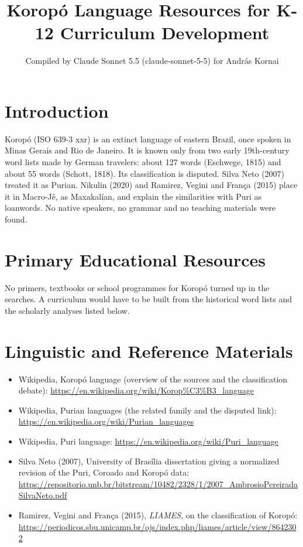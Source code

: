 \documentclass[12pt]{article}
\title{Koropó Language Resources for K-12 Curriculum Development}
\author{Compiled by Claude Sonnet 5.5 (claude-sonnet-5-5) for Andr\'as Kornai}
\date{}
\begin{document}
\maketitle

\section{Introduction}
Koropó (ISO 639-3 xxr) is an extinct language of eastern Brazil, once spoken in Minas Gerais and Rio de Janeiro. It is known only from two early 19th-century word lists made by German travelers: about 127 words (Eschwege, 1815) and about 55 words (Schott, 1818). Its classification is disputed. Silva Neto (2007) treated it as Purian. Nikulin (2020) and Ramirez, Vegini and França (2015) place it in Macro-Jê, as Maxakalían, and explain the similarities with Puri as loanwords. No native speakers, no grammar and no teaching materials were found.

\section{Primary Educational Resources}
No primers, textbooks or school programmes for Koropó turned up in the searches. A curriculum would have to be built from the historical word lists and the scholarly analyses listed below.

\section{Linguistic and Reference Materials}
\begin{itemize}
\item Wikipedia, Koropó language (overview of the sources and the classification debate): \url{https://en.wikipedia.org/wiki/Korop%C3%B3_language}
\item Wikipedia, Purian languages (the related family and the disputed link): \url{https://en.wikipedia.org/wiki/Purian_languages}
\item Wikipedia, Puri language: \url{https://en.wikipedia.org/wiki/Puri_language}
\item Silva Neto (2007), University of Brasília dissertation giving a normalized revision of the Puri, Coroado and Koropó data: \url{https://repositorio.unb.br/bitstream/10482/2328/1/2007_AmbrosioPereiradaSilvaNeto.pdf}
\item Ramirez, Vegini and França (2015), \emph{LIAMES}, on the classification of Koropó: \url{https://periodicos.sbu.unicamp.br/ojs/index.php/liames/article/view/8642302}
\end{itemize}
\end{document}
